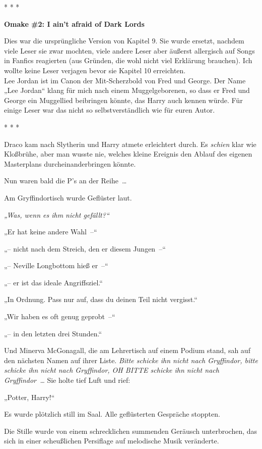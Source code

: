{* * *

\textbf{Omake \#2: I ain't afraid of Dark Lords}

Dies war die ursprüngliche Version von Kapitel 9. Sie wurde ersetzt, nachdem viele Leser sie zwar mochten, viele andere Leser aber äußerst allergisch auf Songs in Fanfics reagierten (aus Gründen, die wohl nicht viel Erklärung brauchen). Ich wollte keine Leser verjagen bevor sie Kapitel 10 erreichten.\\ Lee Jordan ist im Canon der Mit-Scherzbold von Fred und George. Der Name „Lee Jordan“ klang für mich nach einem Muggelgeborenen, so dass er Fred und George ein Muggellied beibringen könnte, das Harry auch kennen würde. Für einige Leser war das nicht so selbstverständlich wie für euren Autor.

* * *

Draco kam nach Slytherin und Harry atmete erleichtert durch. Es \emph{schien} klar wie Kloßbrühe, aber man wusste nie, welches kleine Ereignis den Ablauf des eigenen Masterplans durcheinanderbringen könnte.

Nun waren bald die P's an der Reihe~…

Am Gryffindortisch wurde Geflüster laut.

\emph{„Was, wenn es ihm nicht gefällt?“}

„Er hat keine andere Wahl~--“

„-- nicht nach dem Streich, den er diesem Jungen~--“

„-- Neville Longbottom hieß er~--“

„-- er ist das ideale Angriffsziel.“

„In Ordnung. Pass nur auf, dass du deinen Teil nicht vergisst.“

„Wir haben es oft genug geprobt~--“

„-- in den letzten drei Stunden.“

Und Minerva McGonagall, die am Lehrertisch auf einem Podium stand, sah auf den nächsten Namen auf ihrer Liste. \emph{Bitte schicke ihn nicht nach Gryffindor, bitte schicke ihn nicht nach Gryffindor, OH BITTE schicke ihn nicht nach Gryffindor~…} Sie holte tief Luft und rief:

„Potter, Harry!“

Es wurde plötzlich still im Saal. Alle geflüsterten Gespräche stoppten.

Die Stille wurde von einem schrecklichen summenden Geräusch unterbrochen, das sich in einer scheußlichen Persiflage auf melodische Musik veränderte.

}
